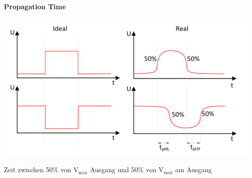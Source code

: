 \noindent\begin{minipage}{\textwidth}
	\noindent\textbf{Propagation Time}
	
	\begin{minipage}{0.25\textwidth}
		\includegraphics[width=\linewidth,keepaspectratio=true]{./Images/propagationtime.png}
	\end{minipage}%
	\begin{minipage}{0.20\textwidth}
		Zeit zwischen 50\% von V$_\text{max}$ Ausgang und 50\% von  V$_\text{max}$ am Ausgang
	\end{minipage}
\end{minipage}


